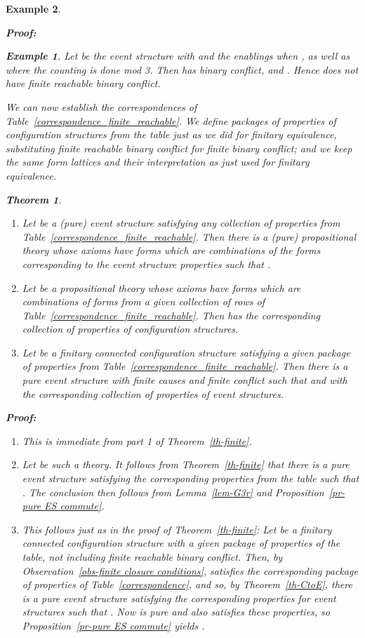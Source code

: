 \documentclass[twocolumn]{article}
\newtheorem{theo}{Theorem}
\newtheorem{exam}{Example}
\newenvironment{theorem}[1]{\begin{theo} \rm \label{th-#1} }{\end{theo}}
\newenvironment{example}[1]{\begin{exam} \rm \label{ex-#1} }{\end{exam}}
\newenvironment{proof}{\begin{trivlist} \item[\hspace{\labelsep}\bf
Proof:]}{\hfill \end{trivlist}}
\newcommand{\thm}[1]{Theorem~\ref{th-#1}}
\newcommand{\pr}[1]{Proposition~\ref{pr-#1}}
\newcommand{\lem}[1]{Lemma~\ref{lem-#1}}
\newcommand{\ob}[1]{Observation~\ref{obs-#1}}
\newcommand{\pf}{{\bf Proof:\ }}
\begin{document}
\begin{example}{causality}
\begin{proof}
\begin{example}{impure finite reachable binary conflict}
Let  be the event structure with
 and the enablings  when
, as well as  where the counting
is done mod 3. Then  has binary conflict,  and
. Hence  does not have finite
reachable binary conflict.
\end{example}

We can now establish the correspondences of Table~\ref{correspondence_finite_reachable}. 
We define packages of properties of configuration structures from the
table just as we did for finitary equivalence, substituting finite reachable
binary conflict for finite binary conflict; and we keep the same form
lattices and their interpretation as just used for finitary
equivalence.
\begin{theorem}{finite_reachable}~
\begin{enumerate}
\item Let  be a (pure) event structure
satisfying any collection of properties
from Table~\ref{correspondence_finite_reachable}. Then there is a (pure) propositional
theory  whose axioms
have forms which are combinations of the forms corresponding to the event structure 
properties such that .
\item Let  be a propositional theory whose axioms
have forms which are combinations of forms from a given collection of rows of 
Table~\ref{correspondence_finite_reachable}. Then 
has the corresponding collection of properties of configuration structures.
\item Let  be a finitary connected configuration structure
satisfying a given package of properties from
Table~\ref{correspondence_finite_reachable}. Then there is a pure
event structure  with finite causes and finite conflict such that
 and with the corresponding collection of properties
of event structures.
\end{enumerate}
\end{theorem}
\pf
\begin{enumerate}
\item This is immediate from part 1 of Theorem~\ref{th-finite}.
\item  Let  be such a theory. It follows from Theorem~\ref{th-finite}
that there is a pure event structure  satisfying the corresponding properties 
from the table such that  . The
conclusion then follows from \lem{G3r} and \pr{pure ES commute}.
\item This follows just as in the proof of \thm{finite}:
Let  be a finitary connected configuration structure with a given package
of properties of the table, not including finite reachable binary conflict.
Then, by \ob{finite closure conditions},  satisfies the
corresponding package of properties of Table~\ref{correspondence},
and so, by \thm{CtoE}, there is a pure  event structure  satisfying 
the corresponding properties for event structures such that 
.
Now  is pure and also satisfies these properties, so \pr{pure ES
commute} yields
.


\end{enumerate}
\end{proof}
\end{example}
\end{document}
